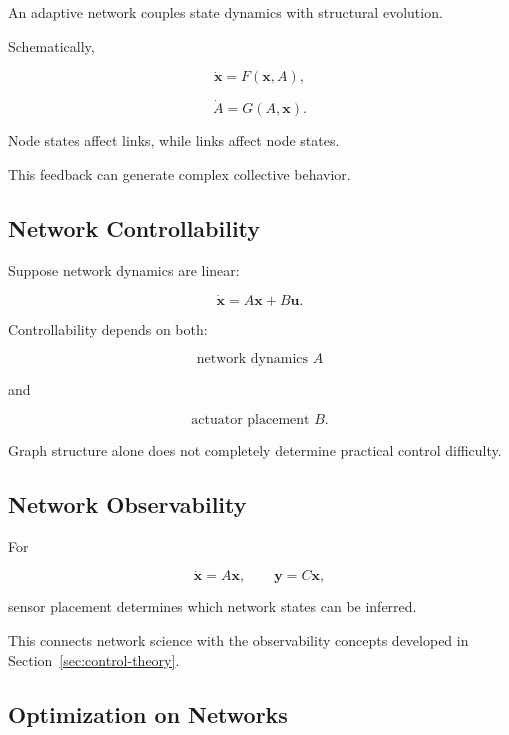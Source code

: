 An adaptive network couples state dynamics with structural evolution.

Schematically,

\[
\boxed{
\dot{\mathbf{x}}
=
F(\mathbf{x},A),
}
\]

\[
\boxed{
\dot{A}
=
G(A,\mathbf{x}).
}
\]

Node states affect links, while links affect node states.

This feedback can generate complex collective behavior.

\subsection{Network Controllability}
\label{subsec:network-controllability}

Suppose network dynamics are linear:

\[
\boxed{
\dot{\mathbf{x}}
=
A\mathbf{x}
+
B\mathbf{u}.
}
\]

Controllability depends on both:

\[
\boxed{
\text{network dynamics }A
}
\]

and

\[
\boxed{
\text{actuator placement }B.
}
\]

Graph structure alone does not completely determine practical control
difficulty.

\subsection{Network Observability}
\label{subsec:network-observability}

For

\[
\dot{\mathbf{x}}
=
A\mathbf{x},
\qquad
\mathbf{y}
=
C\mathbf{x},
\]

sensor placement determines which network states can be inferred.

This connects network science with the observability concepts developed in
Section~\ref{sec:control-theory}.

\subsection{Optimization on Networks}
\label{subsec:optimization-on-networks}

